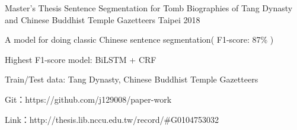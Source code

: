

\begin{cventries}
  \cventry
    {Master's Thesis} %
    {Sentence Segmentation for Tomb Biographies of Tang Dynasty and Chinese Buddhist Temple Gazetteers} %
    {Taipei} %
    {2018} %
    {
      \begin{cvitems} %
        \item {A model for doing classic Chinese sentence segmentation( F1-score: 87\% )   }
        \item {Highest F1-score model: BiLSTM + CRF}
        \item {Train/Test data: Tang Dynasty, Chinese Buddhist Temple Gazetteers}
        \item {Git：https://github.com/j129008/paper-work}
        \item {Link：http://thesis.lib.nccu.edu.tw/record/\#G0104753032}
      \end{cvitems}
    }
\end{cventries}
